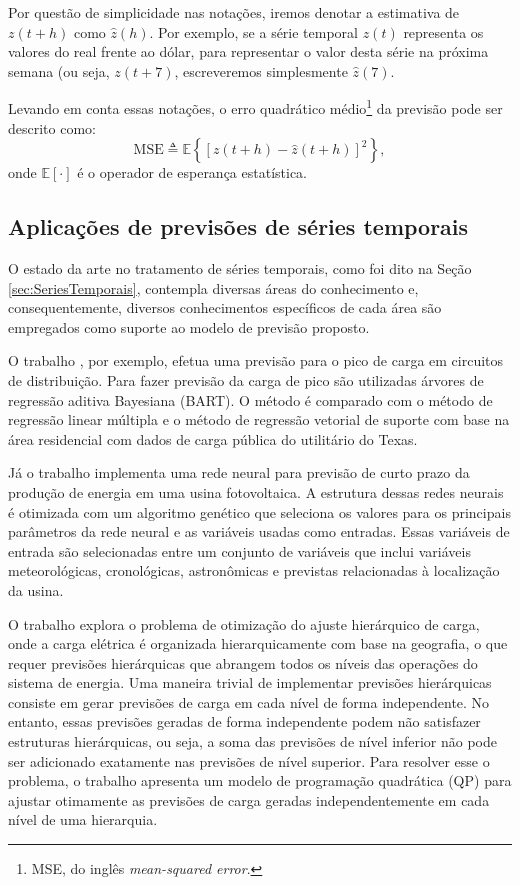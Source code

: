 Por questão de simplicidade nas notações, iremos denotar a estimativa de $z(t+h)$ como $\hat{z}(h)$. Por exemplo, se a série temporal $z(t)$ representa os valores do real frente ao dólar, para representar o valor desta série na próxima semana (ou seja, $z(t + 7)$, escreveremos simplesmente $\hat{z}(7)$. 

Levando em conta essas notações, o erro quadrático médio\footnote{MSE, do inglês \emph{mean-squared error}.} da previsão pode ser descrito como:
\begin{equation}
\text{MSE} \triangleq \mathbb{E}\left\{\left[z(t + h) - \hat{z}(t+h)\right]^2\right\},
\end{equation}
onde $\mathbb{E}[\cdot]$ é o operador de esperança estatística.

\subsection{Aplicações de previsões de séries temporais}
O estado da arte no tratamento de séries temporais, como foi dito na Seção \ref{sec:SeriesTemporais}, contempla diversas áreas do conhecimento e, consequentemente, diversos conhecimentos específicos de cada área são empregados como suporte ao modelo de previsão proposto. 

O trabalho \cite{8412670}, por exemplo, efetua uma previsão para o pico de carga em circuitos de distribuição. Para fazer previsão da carga de pico são utilizadas árvores de regressão aditiva Bayesiana (BART). O método é comparado com o método de regressão linear múltipla e o método de regressão vetorial de suporte com base na área residencial com dados de carga pública do utilitário do Texas.

Já o trabalho \cite{8412036} implementa uma rede neural para previsão de curto prazo da produção de energia em uma usina fotovoltaica. A estrutura dessas redes neurais é otimizada com um algoritmo genético que seleciona os valores para os principais parâmetros da rede neural e as variáveis usadas como entradas. Essas variáveis de entrada são selecionadas entre um conjunto de variáveis que inclui variáveis meteorológicas, cronológicas, astronômicas e previstas relacionadas à localização da usina.

O trabalho \cite{8413116} explora o problema de otimização do ajuste hierárquico de carga, onde a carga elétrica é organizada hierarquicamente com base na geografia, o que requer previsões hierárquicas que abrangem todos os níveis das operações do sistema de energia. Uma maneira trivial de implementar previsões hierárquicas consiste em gerar previsões de carga em cada nível de forma independente. No entanto, essas previsões geradas de forma independente podem não satisfazer estruturas hierárquicas, ou seja, a soma das previsões de nível inferior não pode ser adicionado exatamente nas previsões de nível superior. Para resolver esse o problema, o trabalho \cite{8413116} apresenta um modelo de programação quadrática (QP) para ajustar otimamente as previsões de carga geradas independentemente em cada nível de uma hierarquia.

